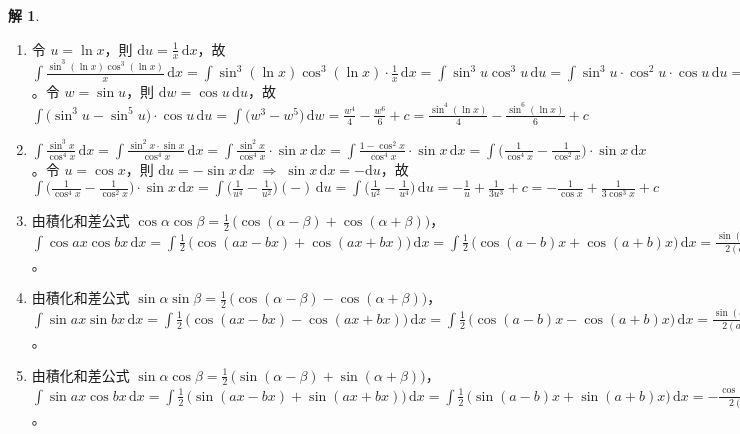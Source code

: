 \documentclass[12pt]{extarticle}
\newcommand{\ds}{\displaystyle}
\newcommand{\ie}{\;\Longrightarrow\;}
\theoremstyle{definition}
\newtheorem*{sol}{解}
\begin{document}
\begin{sol}
\begin{enumerate}
    \item 令 $\ds u = \ln x$，則 $\ds\text{d}u = \frac{1}{x}\,\text{d}x$，故 $\ds\int\!\frac{\sin^3(\ln x)\cos^3(\ln x)}{x}\,\mathrm{d}x = \int\!\sin^3(\ln x)\cos^3(\ln x)\cdot\frac{1}{x}\,\mathrm{d}x = \int\!\sin^3u\cos^3u\,\text{d}u = \int\!\sin^3u\cdot\cos^2u\cdot\cos u\,\text{d}u = \int\!\sin^3 u\big(1 - \sin^2 u\big)\cdot\cos u\,\text{d}u = \int\!\big(\sin^3u - \sin^5u\big)\cdot\cos u\,\text{d}u$。令 $\ds w = \sin u$，則 $\ds\text{d}w = \cos u\,\text{d}u$，故 $\ds\int\!\big(\sin^3u - \sin^5u\big)\cdot\cos u\,\text{d}u = \int\!\big(w^3 - w^5\big)\,\text{d}w = \frac{w^4}{4} - \frac{w^6}{6} + c = \frac{\sin^4(\ln x)}{4} - \frac{\sin^6(\ln x)}{6} + c$
    \item $\ds\int\!\frac{\sin^3 x}{\cos^4 x}\,\mathrm{d}x = \int\!\frac{\sin^2x\cdot\sin x}{\cos^4 x}\,\text{d}x = \int\!\frac{\sin^2x}{\cos^4 x}\cdot\sin x\,\text{d}x = \int\!\frac{1 - \cos^2 x}{\cos^4 x}\cdot\sin x\,\text{d}x = \int\!\big(\frac{1}{\cos^4 x} - \frac{1}{\cos^2 x}\big)\cdot\sin x\,\text{d}x$。令 $\ds u = \cos x$，則 $\ds\text{d}u = -\sin x\,\text{d}x\ie\sin x\,\text{d}x = -\text{d}u$，故 $\ds\int\!\big(\frac{1}{\cos^4 x} - \frac{1}{\cos^2 x}\big)\cdot\sin x\,\text{d}x = \int\!\big(\frac{1}{u^4} - \frac{1}{u^2}\big)(-)\,\text{d}u = \int\!\big(\frac{1}{u^2} - \frac{1}{u^4}\big)\,\text{d}u = -\frac{1}{u} + \frac{1}{3u^3} + c = -\frac{1}{\cos x} + \frac{1}{3\cos^3 x} + c$
    \item 由積化和差公式 $\ds\cos\alpha\cos\beta = \frac{1}{2}\,\big(\cos(\alpha - \beta) + \cos(\alpha + \beta)\big)$，$\ds\int\!\cos ax\cos bx\,\text{d}x = \int\!\frac{1}{2}\,\big(\cos(ax - bx) + \cos(ax + bx)\big)\,\text{d}x = \int\!\frac{1}{2}\,\big(\cos(a - b)x + \cos(a + b)x\big)\,\text{d}x = \frac{\sin{(a-b)x}}{2(a-b)} + \frac{\sin{(a+b)x}}{2(a+b)}+ c$。
    \item 由積化和差公式 $\ds\sin\alpha\sin\beta = \frac{1}{2}\,\big(\cos(\alpha - \beta) - \cos(\alpha + \beta)\big)$，$\ds\int\!\sin ax\sin bx\,\text{d}x = \int\!\frac{1}{2}\,\big(\cos(ax - bx) - \cos(ax + bx)\big)\,\text{d}x = \int\!\frac{1}{2}\,\big(\cos(a - b)x - \cos(a + b)x\big)\,\text{d}x = \frac{\sin{(a-b)x}}{2(a-b)} - \frac{\sin{(a+b)x}}{2(a+b)}+ c$。
    \item 由積化和差公式 $\ds\sin\alpha\cos\beta = \frac{1}{2}\,\big(\sin(\alpha - \beta) + \sin(\alpha + \beta)\big)$，$\ds\int\!\sin ax\cos bx\,\text{d}x = \int\!\frac{1}{2}\,\big(\sin(ax - bx) + \sin(ax + bx)\big)\,\text{d}x = \int\!\frac{1}{2}\,\big(\sin(a - b)x + \sin(a + b)x\big)\,\text{d}x = -\frac{\cos{(a-b)x}}{2(a-b)} - \frac{\cos{(a+b)x}}{2(a+b)}+ c$。
  \end{enumerate}
\end{sol}
\end{document}
